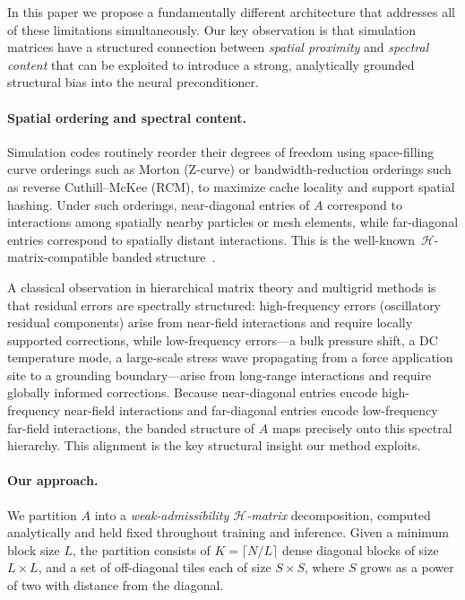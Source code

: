 \documentclass[acmtog,anonymous,review]{acmart}
\begin{document}
In this paper we propose a fundamentally different architecture that addresses all of these
limitations simultaneously.  Our key observation is that simulation matrices have a structured
connection between \emph{spatial proximity} and \emph{spectral content} that can be exploited to
introduce a strong, analytically grounded structural bias into the neural preconditioner.

\paragraph{Spatial ordering and spectral content.}
Simulation codes routinely reorder their degrees of freedom using space-filling curve orderings
such as Morton (Z-curve) or bandwidth-reduction orderings such as reverse Cuthill--McKee (RCM),
to maximize cache locality and support spatial hashing.  Under such orderings, near-diagonal
entries of $A$ correspond to interactions among spatially nearby particles or mesh elements, while
far-diagonal entries correspond to spatially distant interactions.  This is the
well-known~$\mathcal{H}$-matrix-compatible banded structure~\cite{hackbusch1999sparse}.

A classical observation in hierarchical matrix theory and multigrid methods is that residual
errors are spectrally structured: high-frequency errors (oscillatory residual components) arise
from near-field interactions and require locally supported corrections, while low-frequency
errors---a bulk pressure shift, a DC temperature mode, a large-scale stress wave propagating from
a force application site to a grounding boundary---arise from long-range interactions and require
globally informed corrections.  Because near-diagonal entries encode high-frequency near-field
interactions and far-diagonal entries encode low-frequency far-field interactions, the banded
structure of $A$ maps precisely onto this spectral hierarchy.  This alignment is the key
structural insight our method exploits.

\paragraph{Our approach.}
We partition $A$ into a \emph{weak-admissibility $\mathcal{H}$-matrix} decomposition, computed
analytically and held fixed throughout training and inference.  Given a minimum block size $L$,
the partition consists of $K = \lceil N/L \rceil$ dense diagonal blocks of size $L \times L$,
and a set of off-diagonal tiles each of size $S \times S$, where $S$ grows as a power of two with
distance from the diagonal.
\end{document}
